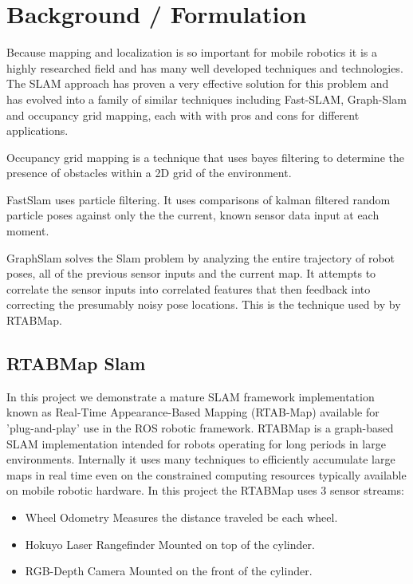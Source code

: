 \documentclass[10pt,journal,compsoc]{IEEEtran}
\begin{document}
\section{Background / Formulation}
Because mapping and localization is so important for mobile robotics it is a highly researched field and has many well developed techniques and technologies. The SLAM approach has proven a very effective solution for this problem and has evolved into a family of similar techniques including Fast-SLAM, Graph-Slam and occupancy grid mapping, each with with pros and cons for different applications. 

Occupancy grid mapping is a technique that uses bayes filtering to determine the presence of obstacles within a 2D grid of the environment.

FastSlam uses particle filtering. It uses comparisons of kalman filtered random particle poses against only the the current, known sensor data input at each moment.

GraphSlam solves the Slam problem by analyzing the entire trajectory of robot poses, all of the previous sensor inputs and the current map. It attempts to correlate the sensor inputs into correlated features that then feedback into correcting the  presumably noisy pose locations. This is the technique used by by RTABMap.

\subsection{RTABMap Slam}
In this project we demonstrate a mature SLAM framework implementation known as Real-Time Appearance-Based Mapping (RTAB-Map) available for 'plug-and-play' use in the ROS robotic framework. RTABMap is a graph-based SLAM implementation intended for robots operating for long periods in large environments. Internally it uses many techniques to efficiently accumulate large maps in real time even on the constrained computing resources typically available on mobile robotic hardware. In this project the RTABMap uses 3 sensor streams:

\begin{itemize}
 \item Wheel Odometry
 Measures the distance traveled be each wheel.
 \item Hokuyo Laser Rangefinder
 Mounted on top of the cylinder.
 \item RGB-Depth Camera
 Mounted on the front of the cylinder.
\end{itemize}
\end{document}
